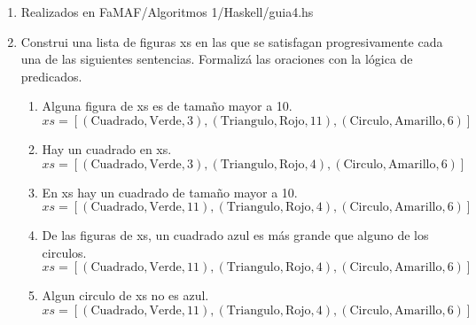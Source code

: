 \documentclass[12pt]{article} %
\begin{document}
\begin{enumerate}
    \item Realizados en FaMAF/Algoritmos 1/Haskell/guia4.hs
    \item Construi una lista de figuras xs en las que se satisfagan progresivamente cada una de las siguientes
    sentencias. Formalizá las oraciones con la lógica de predicados.
    \begin{enumerate}
        \item Alguna figura de xs es de tamaño mayor a 10. \\
        \( xs = [(\text{Cuadrado}, \text{Verde}, 3),(\text{Triangulo}, \text{Rojo}, 11), (\text{Circulo}, \text{Amarillo}, 6)] \) 
        \item Hay un cuadrado en xs. \\
        \( xs = [(\text{Cuadrado}, \text{Verde}, 3),(\text{Triangulo}, \text{Rojo}, 4), (\text{Circulo}, \text{Amarillo}, 6)] \)
        \item En xs hay un cuadrado de tamaño mayor a 10. \\
        \( xs = [(\text{Cuadrado}, \text{Verde}, 11),(\text{Triangulo}, \text{Rojo}, 4), (\text{Circulo}, \text{Amarillo}, 6)] \)
        \item De las figuras de xs, un cuadrado azul es más grande que alguno de los circulos. \\
        \( xs = [(\text{Cuadrado}, \text{Verde}, 11),(\text{Triangulo}, \text{Rojo}, 4), (\text{Circulo}, \text{Amarillo}, 6)] \)
        \item Algun circulo de xs no es azul. \\
        \( xs = [(\text{Cuadrado}, \text{Verde}, 11),(\text{Triangulo}, \text{Rojo}, 4), (\text{Circulo}, \text{Amarillo}, 6)] \)
    \end{enumerate}
\end{enumerate}
\end{document}
